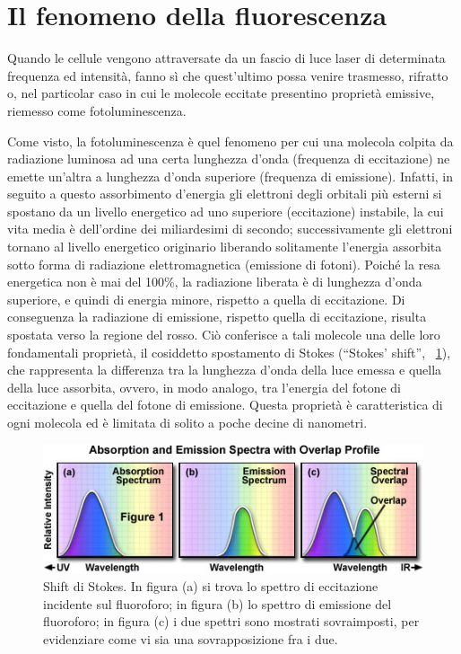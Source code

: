 \section{Il fenomeno della fluorescenza}

Quando le cellule vengono attraversate da un fascio di luce laser di determinata frequenza ed intensità, fanno sì che quest'ultimo possa venire trasmesso, rifratto o, nel particolar caso in cui le molecole eccitate presentino proprietà emissive, riemesso come fotoluminescenza. 

Come visto, la fotoluminescenza è quel fenomeno per cui una molecola colpita da radiazione luminosa ad una certa lunghezza d'onda (frequenza di eccitazione) ne emette un'altra a lunghezza d'onda superiore (frequenza di emissione). 
Infatti, in seguito a questo assorbimento d'energia gli elettroni degli orbitali più esterni si spostano da un livello energetico ad uno superiore (eccitazione) instabile, la cui vita media è dell'ordine dei miliardesimi di secondo; successivamente gli elettroni tornano al livello energetico originario liberando solitamente l'energia assorbita sotto forma di radiazione elettromagnetica (emissione di fotoni). 
Poiché la resa energetica non è mai del 100\%, la radiazione liberata è di lunghezza d'onda superiore, e quindi di energia minore, rispetto a quella di eccitazione. 
Di conseguenza la radiazione di emissione, rispetto quella di eccitazione, risulta spostata verso la regione del rosso. 
Ciò conferisce a tali molecole una delle loro fondamentali proprietà, il cosiddetto spostamento di Stokes (``Stokes' shift'', \figurename~\ref{fig:stokes}), che rappresenta la differenza tra la lunghezza d'onda della luce emessa e quella della luce assorbita, ovvero, in modo analogo, tra l'energia del fotone di eccitazione e quella del fotone di emissione.
Questa proprietà è caratteristica di ogni molecola ed è limitata di solito a poche decine di nanometri.

\begin{figure}
 \centering
\includegraphics[scale=0.80]{img/CAP1stokes.jpg}
 \caption{ \small{Shift di Stokes.} In figura (a) si trova lo spettro di eccitazione incidente sul fluoroforo; in figura (b) lo spettro di emissione del fluoroforo; in figura (c) i due spettri sono mostrati sovraimposti, per evidenziare come vi sia una sovrapposizione fra i due.}
 \label{fig:stokes}
\end{figure}

